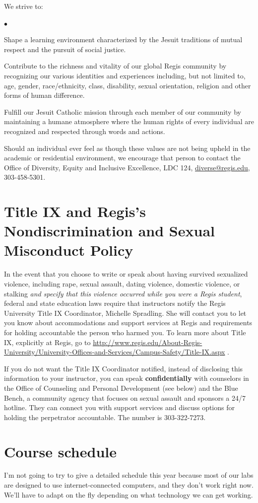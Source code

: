 \documentclass[11pt]{article}
\newcommand{\squishlist}{
   \begin{list}{$\bullet$}
    { \setlength{\itemsep}{0pt}      \setlength{\parsep}{3pt}
      \setlength{\topsep}{3pt}       \setlength{\partopsep}{0pt}
      \setlength{\leftmargin}{1.5em} \setlength{\labelwidth}{1em}
      \setlength{\labelsep}{0.5em} } }
\newcommand{\squishend}{
    \end{list}  }
\begin{document}
{We strive to:
\squishlist
\item Shape a learning environment characterized by the Jesuit traditions of mutual respect and the pursuit of social justice.
\item Contribute to the richness and vitality of our global Regis community by recognizing our various identities and experiences including, but not limited to, age, gender, race/ethnicity, class, disability, sexual orientation, religion and other forms of human difference.
\item Fulfill our Jesuit Catholic mission through each member of our community by maintaining a humane atmosphere where the human rights of every individual are recognized and respected through words and actions.
\squishend
Should an individual ever feel as though these values are not being upheld in the academic or residential environment, we encourage that person to contact the Office of Diversity, Equity and Inclusive Excellence, LDC 124, \url{diverse@regis.edu}, 303-458-5301. 

\section{Title IX and Regis's Nondiscrimination and Sexual Misconduct Policy}

In the event that you choose to write or speak about having survived sexualized violence, including rape, sexual assault, dating violence, domestic violence, or stalking {\em and specify that this violence occurred while you were a Regis student}, federal and state education laws require that instructors notify the Regis University Title IX Coordinator, Michelle Spradling. She will contact you to let you know about accommodations and support services at Regis and requirements for holding accountable the person who harmed you. To learn more about Title IX, explicitly at Regis, go to \url{http://www.regis.edu/About-Regis-University/University-Offices-and-Services/Campus-Safety/Title-IX.aspx} .

If you do not want the Title IX Coordinator notified, instead of disclosing this information to your instructor, you can speak {\bf confidentially} with counselors in the Office of Counseling and Personal Development (see below) and the Blue Bench, a community agency that focuses on sexual assault and sponsors a 24/7 hotline. They can connect you with support services and discuss options for holding the perpetrator accountable.  The number is 303-322-7273.


\section{Course schedule}
I'm not going to try to give a detailed schedule this year because most of our labs are designed to use internet-connected computers, and they don't work right now. We'll have to adapt on the fly depending on what technology we can get working.
}
\end{document}
